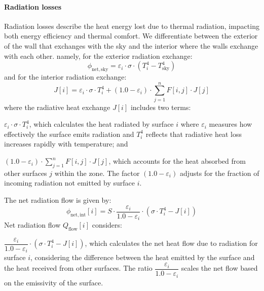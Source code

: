 \documentclass[runningheads]{llncs}
\begin{document}
\paragraph{Radiation losses} Radiation losses describe the heat energy lost due to thermal radiation, impacting both energy efficiency and thermal comfort.
We differentiate between the exterior of the wall that exchanges with the sky and the interior where the walls exchange with each other.
namely, for the exterior radiation exchange:
\begin{equation}
  \phi_{\mathrm{net,sky}} = \varepsilon_i \cdot \sigma \cdot \left( T_i^4 - T_{\mathrm{sky}}^4 \right)
\end{equation}
and for the interior radiation exchange:
\begin{equation}
  J[i] = \varepsilon_i \cdot \sigma \cdot T_i^4 + \left( 1.0 - \varepsilon_i \right) \cdot \sum_{j=1}^{n} F[i,j] \cdot J[j]
\end{equation}
where the radiative heat exchange $J[i]$ includes two terms:
\begin{inparaenum}[\it (i)]
    \item $\varepsilon_i \cdot \sigma \cdot T_i^4$, which calculates the heat radiated by surface $i$ where $\varepsilon_i$ measures how effectively the surface emits radiation and $T_i^4$ reflects that radiative heat loss increases rapidly with temperature; and
    \item $\left( 1.0 - \varepsilon_i \right) \cdot \sum_{j=1}^{n} F[i,j] \cdot J[j]$, which accounts for the heat absorbed from other surfaces $j$ within the zone. The factor $\left( 1.0 - \varepsilon_i \right)$ adjusts for the fraction of incoming radiation not emitted by surface $i$.
\end{inparaenum}
The net radiation flow is given by:
\begin{equation}
  \phi_{\mathrm{net,int}}[i] = S \cdot \dfrac{\varepsilon_i}{1.0 - \varepsilon_i} \cdot \left( \sigma \cdot T_i^4 - J[i] \right)
\end{equation}
Net radiation flow $Q_{\mathrm{flow}}[i]$ considers:
\begin{inparaenum}[\it (i)]
    \item $\dfrac{\varepsilon_i}{1.0 - \varepsilon_i} \cdot \left( \sigma \cdot T_i^4 - J[i] \right)$, which calculates the net heat flow due to radiation for surface $i$, considering the difference between the heat emitted by the surface and the heat received from other surfaces. The ratio $\dfrac{\varepsilon_i}{1.0 - \varepsilon_i}$ scales the net flow based on the emissivity of the surface.
\end{inparaenum}
\end{document}
